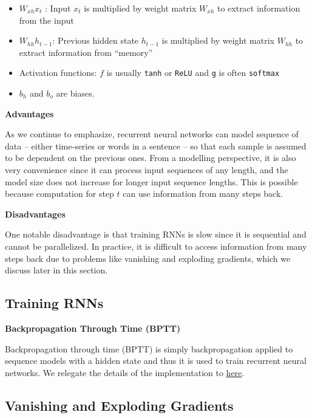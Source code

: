 \documentclass[
]{book}
\providecommand{\tightlist}{%
  \setlength{\itemsep}{0pt}\setlength{\parskip}{0pt}}
\begin{document}
\begin{itemize}
\tightlist
\item
  \(W_{xh}x_t\) : Input \(x_t\) is multiplied by weight matrix \(W_{xh}\) to extract information from the input
\item
  \(W_{hh}h_{t-1}\): Previous hidden state \(h_{t-1}\) is multiplied by weight matrix \(W_{hh}\) to extract information from ``memory''
\item
  Activation functions: \(f\) is usually \texttt{tanh} or \texttt{ReLU} and \texttt{g} is often \texttt{softmax}
\item
  \(b_h\) and \(b_o\) are biases.
\end{itemize}

\textbf{Advantages}

As we continue to emphasize, recurrent neural networks can model sequence of data -- either time-series or words in a sentence -- so that each sample is assumed to be dependent on the previous ones. From a modelling perspective, it is also very convenience since it can process input sequences of any length, and the model size does not increase for longer input sequence lengths. This is possible because computation for step \(t\) can use information from many steps back.

\textbf{Disadvantages}

One notable disadvantage is that training RNNs is slow since it is sequential and cannot be parallelized. In practice, it is difficult to access information from many steps back due to problems like vanishing and exploding gradients, which we discuss later in this section.

\hypertarget{training-rnns}{%
\subsection{Training RNNs}\label{training-rnns}}

\textbf{Backpropagation Through Time (BPTT)}

Backpropagation through time (BPTT) is simply backpropagation applied to sequence models with a hidden state and thus it is used to train recurrent neural networks. We relegate the details of the implementation to \href{https://d2l.ai/chapter_recurrent-neural-networks/bptt.html}{here}.

\hypertarget{vanishing-and-exploding-gradients}{%
\subsection{Vanishing and Exploding Gradients}\label{vanishing-and-exploding-gradients}}
\end{document}
